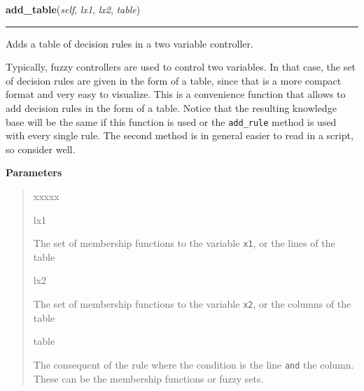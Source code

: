     \label{peach:fuzzy:control:Controller:add_table}

    \vspace{0.5ex}

    \begin{boxedminipage}{\textwidth}

    \raggedright \textbf{add\_table}(\textit{self}, \textit{lx1}, \textit{lx2}, \textit{table})

    \vspace{-1.5ex}

    \rule{\textwidth}{0.5\fboxrule}

Adds a table of decision rules in a two variable controller.

Typically, fuzzy controllers are used to control two variables. In that
case, the set of decision rules are given in the form of a table, since
that is a more compact format and very easy to visualize. This is a
convenience function that allows to add decision rules in the form of a
table. Notice that the resulting knowledge base will be the same if this
function is used or the \texttt{add{\_}rule} method is used with every single
rule. The second method is in general easier to read in a script, so
consider well.
    \vspace{1ex}

      \textbf{Parameters}
      \begin{quote}
        \begin{Ventry}{xxxxx}

          \item[lx1]


The set of membership functions to the variable \texttt{x1}, or the
lines of the table
          \item[lx2]


The set of membership functions to the variable \texttt{x2}, or the
columns of the table
          \item[table]


The consequent of the rule where the condition is the line \texttt{and}
the column. These can be the membership functions or fuzzy sets.
        \end{Ventry}

      \end{quote}

    \vspace{1ex}

    \end{boxedminipage}

